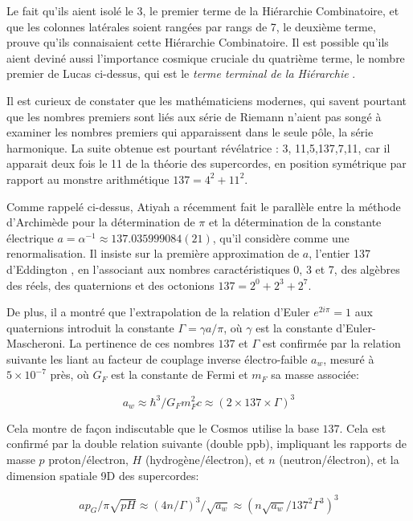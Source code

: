 \documentclass[a4paper,9pt]{article}
\newcounter{col}
\begin{document}
Le fait qu'ils aient isolé le 3, le premier terme de la Hiérarchie Combinatoire, et que les colonnes latérales soient rangées par rangs de 7, le deuxième terme, prouve qu'ils connaisaient cette Hiérarchie Combinatoire. Il est possible qu'ils aient deviné aussi l'importance cosmique cruciale du quatrième terme, le nombre premier de Lucas ci-dessus, qui est le \textit{terme terminal de la Hiérarchie} \cite {Sanchez2}.

Il est curieux de constater que les mathématiciens modernes, qui savent pourtant que les nombres premiers sont liés aux série de Riemann n'aient pas songé à examiner les nombres premiers qui apparaissent dans le seule pôle, la série harmonique. La suite obtenue est pourtant révélatrice : 3, 11,5,137,7,11, car il apparait deux fois le 11 de la théorie des supercordes, en position symétrique par rapport au monstre arithmétique $137 = 4^2 + 11^2$.

Comme rappelé ci-dessus, Atiyah a récemment fait le parallèle entre la méthode d’Archimède pour la détermination de $\pi$ et la détermination de la constante électrique $a = \alpha^{-1} ≈ 137.035999084(21)$, qu’il considère comme une renormalisation. Il insiste sur la première approximation de $a$, l’entier 137 d'Eddington \cite{Eddington}, en l’associant aux nombres caractéristiques 0, 3 et 7, des algèbres des réels, des quaternions et des octonions $137 = 2^0 + 2^3 + 2^7$. 
 
De plus, il a montré que l’extrapolation de la relation d’Euler $e^{2i\pi} = 1$ aux quaternions introduit la constante $\Gamma = \gamma a/\pi$, où $\gamma$  est la constante d’Euler-Mascheroni. La pertinence de ces nombres $137$ et $\Gamma$ est confirmée par la relation suivante les liant au facteur de couplage inverse électro-faible $a_w$, mesuré à $5 \times 10^{-7}$ près, où $G_F$  est la constante de Fermi et $m_F$ sa masse associée:

\begin{equation}
 a_w \approx  \hbar^3/G_Fm_F^2c \approx (2 \times 137 \times \Gamma)^3 
 \end{equation}

Cela montre de façon indiscutable que le Cosmos utilise la base $137$. Cela est confirmé par la double relation suivante (double ppb), impliquant les rapports de masse $p$ proton/électron, $H$ (hydrogène/électron), et $n$ (neutron/électron), et la dimension spatiale 9D des supercordes:

\begin{equation}
 ap_G/\pi \sqrt{pH} \approx  (4n/\Gamma)^3/\sqrt{a_w} \approx  (n\sqrt{a_w}/137^2 \Gamma^3)^3  
 \end{equation}
\end{document}
